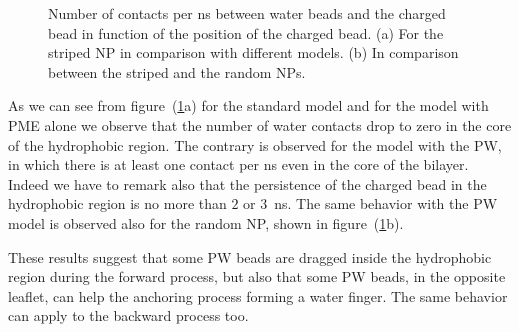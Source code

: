 \begin{figure}[!ht]
	\center
	\caption{Number of contacts per ns between water beads and the charged bead in function of the position of the charged bead. (a) For the striped \acs{NP} in comparison with different models. (b) In comparison between the striped and the random \acs{NP}s.}
	\label{fig:WContact}
\end{figure}

As we can see from figure~(\ref{fig:WContact}a) for the standard \martini model and for the model with \ac{PME} alone we observe that the number of water contacts drop to zero in the core of the hydrophobic region. The contrary is observed for the model with the \ac{PW}, in which there is at least one contact per ns even in the core of the bilayer. Indeed we have to remark also that the persistence of the charged bead in the hydrophobic region is no more than $2$ or $3$~ns. The same behavior with the \ac{PW} model is observed also for the random \ac{NP}, shown in figure~(\ref{fig:WContact}b).

These results suggest that some \ac{PW} beads are dragged inside the hydrophobic region during the forward process, but also that some \ac{PW} beads, in the opposite leaflet, can help the anchoring process forming a water finger. The same behavior can apply to the backward process too.
 
